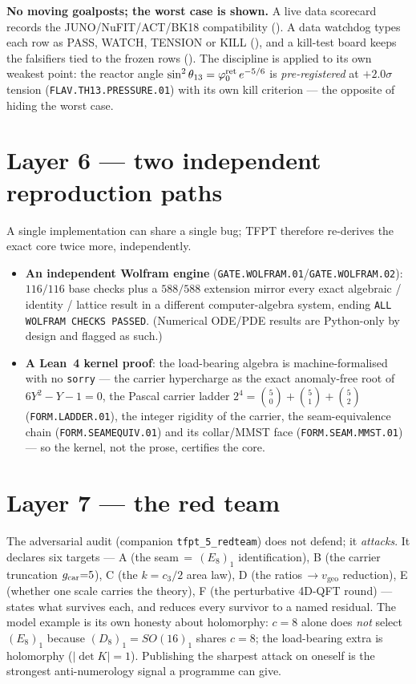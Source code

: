 \par\smallskip\noindent\textbf{No moving goalposts; the worst case is shown.} A live data scorecard records
the JUNO/NuFIT/ACT/BK18 compatibility (). A data watchdog types each row
as PASS, WATCH, TENSION or KILL (), and a kill-test board keeps the falsifiers
tied to the frozen rows (). The discipline is applied to its own weakest
point: the reactor angle $\sin^2\theta_{13}=\varphi_0^{\mathrm{ret}}\,e^{-5/6}$ is \emph{pre-registered} at $+2.0\sigma$ tension
(\texttt{FLAV.TH13.PRESSURE.01}) with its own kill criterion --- the opposite of hiding the worst case.

\section{Layer 6 --- two independent reproduction paths}
A single implementation can share a single bug; TFPT therefore re-derives the exact core twice more,
independently.
\begin{itemize}
\item \textbf{An independent Wolfram engine} (\texttt{GATE.WOLFRAM.01}/\texttt{GATE.WOLFRAM.02}):
$116/116$ base checks plus a $588/588$ extension mirror every exact algebraic / identity / lattice result
in a different computer-algebra system, ending \texttt{ALL WOLFRAM CHECKS PASSED}. (Numerical ODE/PDE
results are Python-only by design and flagged as such.)
\item \textbf{A Lean~4 kernel proof}: the load-bearing algebra is machine-formalised with no \texttt{sorry}
--- the carrier hypercharge as the exact anomaly-free root of $6Y^2{-}Y{-}1=0$, the Pascal carrier
ladder $2^4=\binom50{+}\binom51{+}\binom52$ (\texttt{FORM.LADDER.01}), the integer rigidity of the carrier,
the seam-equivalence chain (\texttt{FORM.SEAMEQUIV.01}) and its collar/MMST face
(\texttt{FORM.SEAM.MMST.01}) --- so the kernel, not the prose, certifies the core.
\end{itemize}

\section{Layer 7 --- the red team}
The adversarial audit (companion \texttt{tfpt\_5\_redteam}) does not defend; it \emph{attacks}. It declares
six targets --- A (the seam$\,=\,(E_8)_1$ identification), B (the carrier truncation $g_{\mathrm{car}}{=}5$), C (the
$k{=}c_3/2$ area law), D (the ratios$\,\to v_{\mathrm{geo}}$ reduction), E (whether one scale carries the
theory), F (the perturbative 4D-QFT round) --- states what survives each, and reduces every survivor to a
named residual. The model
example is its own honesty about holomorphy: $c=8$ alone does \emph{not} select $(E_8)_1$ because
$(D_8)_1=SO(16)_1$ shares $c=8$; the load-bearing extra is holomorphy ($|\!\det K|=1$). Publishing the
sharpest attack on oneself is the strongest anti-numerology signal a programme can give.

